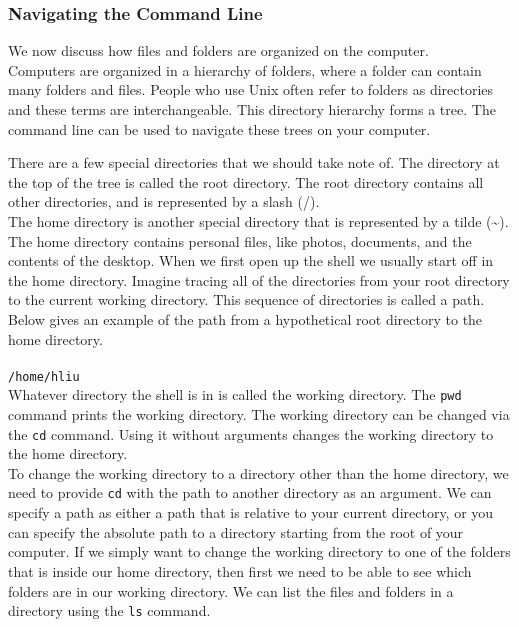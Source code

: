 \documentclass[12pt]{article}
\newcommand{\code}[1]{
\texttt{#1}
}
\begin{document}
		 \subsubsection{Navigating the Command Line}
		 
		 We now discuss how files and folders are organized on the computer.\\
		 
		 Computers are organized in a hierarchy of folders, where a folder can contain many folders and files. People who use Unix often refer to folders as directories and these terms are interchangeable. This directory hierarchy forms a tree. The command line can be used to navigate these trees on your computer.
		 
		 There are a few special directories that we should take note of. The directory at the top of the tree is called the root directory. The root directory contains all other directories, and is represented by a slash (/).\\
		 
		 The home directory is another special directory that is represented by a tilde (\textasciitilde). The home directory contains personal files, like photos, documents, and the contents of the desktop. When we first open up the shell we usually start off in the home directory. Imagine tracing all of the directories from your root directory to the current working directory. This sequence of directories is called a path. Below gives an example of the path from a hypothetical root directory to the home directory.\\\\
		 \code{/home/hliu}\\
		 
		  Whatever directory the shell is in is called the working directory. The \code{pwd} command prints the working directory. The working directory can be changed via the \code{cd} command. Using it without arguments changes the working directory to the home directory. \\
		  
		  To change the working directory to a directory other than the home directory, we need to provide \code{cd} with the path to another directory as an argument. We can specify a path as either a path that is relative to your current directory, or you can specify the absolute path to a directory starting from the root of your computer. If we simply want to change the working directory to one of the folders that is inside our home directory, then first we need to be able to see which folders are in our working directory. We can list the files and folders in a directory using the \code{ls} command.
		  
\end{document}
